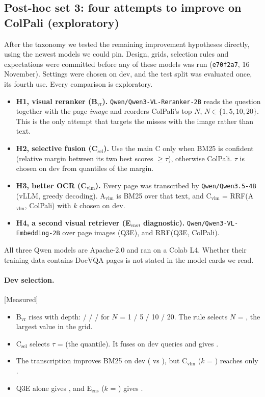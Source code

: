 \documentclass[11pt,a4paper]{article}
\newcommand{\lbl}[2]{\textsf{\scriptsize\textcolor{#1}{[#2]}}}
\newcommand{\Mea}{\lbl{tagM}{Measured}}
\begin{document}
\subsection{Post-hoc set 3: four attempts to improve on ColPali (exploratory)}
\label{sec:posthoc3}
After the taxonomy we tested the remaining improvement hypotheses directly, using the newest models we could pin. Design, grids, selection rules and expectations were committed before any of these models was run (\texttt{e70f2a7}, 16 November). Settings were chosen on dev, and the test split was evaluated once, its fourth use. Every comparison is exploratory.
\begin{itemize}
  \item \textbf{H1, visual reranker (B$_\text{vr}$).} \texttt{Qwen/Qwen3-VL-Reranker-2B} reads the question together with the page \emph{image} and reorders ColPali's top $N$, $N \in \{1, 5, 10, 20\}$. This is the only attempt that targets the misses with the image rather than text.
  \item \textbf{H2, selective fusion (C$_\text{sel}$).} Use the main C only when BM25 is confident (relative margin between its two best scores $\geq \tau$), otherwise ColPali. $\tau$ is chosen on dev from quantiles of the margin.
  \item \textbf{H3, better OCR (C$_\text{vlm}$).} Every page was transcribed by \texttt{Qwen/Qwen3.5-4B} (vLLM, greedy decoding). A$_\text{vlm}$ is BM25 over that text, and C$_\text{vlm}$ = RRF(A$_\text{vlm}$, ColPali) with $k$ chosen on dev.
  \item \textbf{H4, a second visual retriever (E$_\text{ens}$, diagnostic).} \texttt{Qwen/Qwen3-VL-Embedding-2B} over page images (Q3E), and RRF(Q3E, ColPali).
\end{itemize}
All three Qwen models are Apache-2.0 and ran on a Colab L4. Whether their training data contains DocVQA pages is not stated in the model cards we read.

\paragraph{Dev selection.} \Mea{}
\begin{itemize}
  \item B$_\text{vr}$ rises with depth: \devB{} / \devBvrFive{} / \devBvrTen{} / \devBvr{} for $N$ = 1 / 5 / 10 / 20. The rule selects $N$ = \nVr{}, the largest value in the grid.
  \item C$_\text{sel}$ selects $\tau$ = \tauSel{} (the \tauSelQ{} quantile). It fuses on \selDevFused{} dev queries and gives \devCsel{}.
  \item The transcription improves BM25 on dev (\devAvlm{} vs \devA{}), but C$_\text{vlm}$ ($k$ = \kVlm{}) reaches only \devCvlm{}.
  \item Q3E alone gives \devQthreeE{}, and E$_\text{ens}$ ($k$ = \kEens{}) gives \devEens{}.
\end{itemize}
\end{document}
